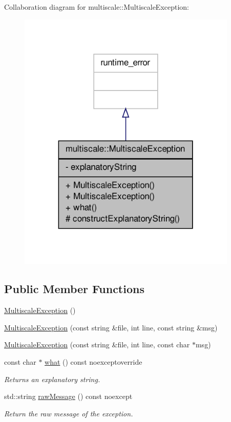 Collaboration diagram for multiscale\-:\-:Multiscale\-Exception\-:\nopagebreak
\begin{figure}[H]
\begin{center}
\leavevmode
\includegraphics[width=296pt]{classmultiscale_1_1MultiscaleException__coll__graph}
\end{center}
\end{figure}
\subsection*{Public Member Functions}
\begin{DoxyCompactItemize}
\item 
\hyperlink{classmultiscale_1_1MultiscaleException_a12ea1d81690b812c46bc58b966732e1b}{Multiscale\-Exception} ()
\item 
\hyperlink{classmultiscale_1_1MultiscaleException_a6eb7d129f239cc1c4f497b1bbaf94fa5}{Multiscale\-Exception} (const string \&file, int line, const string \&msg)
\item 
\hyperlink{classmultiscale_1_1MultiscaleException_a3c0023538ce22fcd663b98a39b12d5a5}{Multiscale\-Exception} (const string \&file, int line, const char $\ast$msg)
\item 
const char $\ast$ \hyperlink{classmultiscale_1_1MultiscaleException_a2750c3e86e792919a8a4323b83800530}{what} () const noexceptoverride
\begin{DoxyCompactList}\small\item\em Returns an explanatory string. \end{DoxyCompactList}\item 
std\-::string \hyperlink{classmultiscale_1_1MultiscaleException_ad496ffc83a971e62b8130bcc90bc98b6}{raw\-Message} () const noexcept
\begin{DoxyCompactList}\small\item\em Return the raw message of the exception. \end{DoxyCompactList}\end{DoxyCompactItemize}
